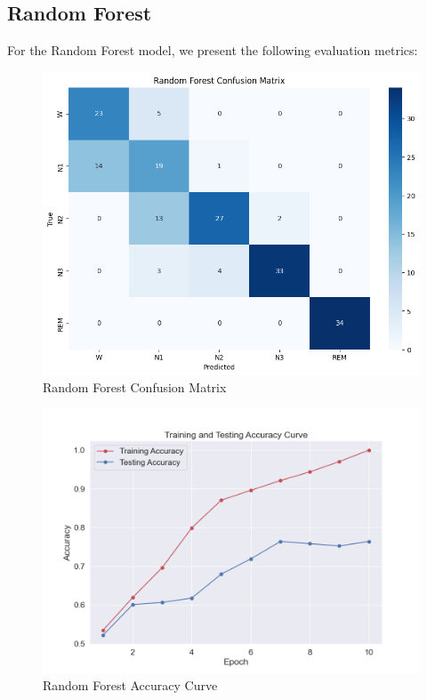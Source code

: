 \subsection{Random Forest}

For the Random Forest model, we present the following evaluation metrics:

\begin{figure}[H]
	\centering
	\includegraphics[width=\textwidth]{img/paper_1/random_forest_confusion_matrix.png}
	\caption{Random Forest Confusion Matrix}
\end{figure}

\begin{figure}[H]
	\centering
	\includegraphics[width=\textwidth]{img/paper_1/accuracy_curve.png}
	\caption{Random Forest Accuracy Curve}
\end{figure}

